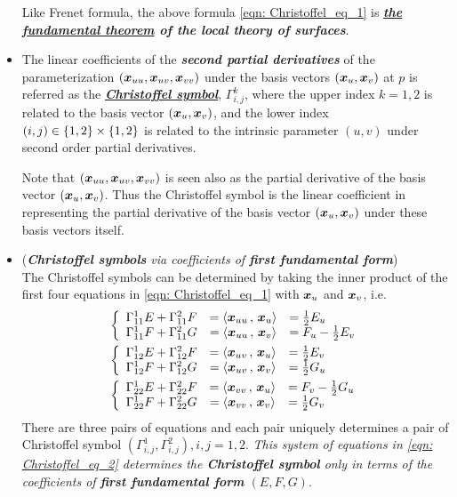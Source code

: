 \documentclass[11pt]{article}
\begin{document}
\begin{itemize}
Like Frenet formula, the above formula \eqref{eqn: Christoffel_eq_1} is \emph{\textbf{\underline{the fundamental theorem} of the local theory of surfaces}}. 

\item The linear coefficients of the \textbf{\emph{second partial derivatives}} of the parameterization $(\boldsymbol{x}_{uu}, \boldsymbol{x}_{uv}, \boldsymbol{x}_{vv})$ under the basis vectors $(\boldsymbol{x}_{u}, \boldsymbol{x}_{v})$ at $p$ is referred as the \underline{\emph{\textbf{Christoffel symbol}}}, $\Gamma_{i,j}^{k}$, where the upper index $k=1,2$ is related to the basis vector $(\boldsymbol{x}_{u}, \boldsymbol{x}_{v})$, and the lower index $(i,j) \in \left\{1,2\right\}\times \left\{1,2\right\}$ is related to the intrinsic parameter $(u,v)$ under second order partial derivatives. 

Note that  $(\boldsymbol{x}_{uu}, \boldsymbol{x}_{uv}, \boldsymbol{x}_{vv})$ is seen also as the partial derivative of the basis vector $(\boldsymbol{x}_{u}, \boldsymbol{x}_{v})$. Thus the Christoffel symbol is the linear coefficient in representing  the partial derivative of the basis vector $(\boldsymbol{x}_{u}, \boldsymbol{x}_{v})$ under these basis vectors itself. 

\item (\emph{\textbf{Christoffel symbols} via coefficients of \textbf{first fundamental form}})\\
The Christoffel symbols can be determined by taking the inner product of the first four equations in \eqref{eqn: Christoffel_eq_1} with $\boldsymbol{x}_{u}$ and $\boldsymbol{x}_{v}$, i.e. 
\begin{align}
&\left\{ \begin{array}{ccl}
\Gamma_{11}^{1}E + \Gamma_{11}^{2}F &= \left\langle \boldsymbol{x}_{uu}\,,\, \boldsymbol{x}_{u} \right\rangle &= \frac{1}{2}E_{u} \\ 
\Gamma_{11}^{1}F + \Gamma_{11}^{2}G &= \left\langle \boldsymbol{x}_{uu}\,,\, \boldsymbol{x}_{v} \right\rangle &= F_{u} - \frac{1}{2}E_{v} 
\end{array} \right. \nonumber\\
&\left\{ \begin{array}{ccl}
\Gamma_{12}^{1}E + \Gamma_{12}^{2}F &= \left\langle \boldsymbol{x}_{uv}\,,\, \boldsymbol{x}_{u} \right\rangle &= \frac{1}{2}E_{v} \\ 
\Gamma_{12}^{1}F + \Gamma_{12}^{2}G &= \left\langle \boldsymbol{x}_{uv}\,,\, \boldsymbol{x}_{v} \right\rangle &= \frac{1}{2}G_{u}  
\end{array} \right. \nonumber\\
&\left\{ \begin{array}{ccl}
\Gamma_{22}^{1}E + \Gamma_{22}^{2}F &= \left\langle \boldsymbol{x}_{vv}\,,\, \boldsymbol{x}_{u} \right\rangle &=F_{v} - \frac{1}{2}G_{u}  \\ 
\Gamma_{22}^{1}F + \Gamma_{22}^{2}G &= \left\langle \boldsymbol{x}_{vv}\,,\, \boldsymbol{x}_{v} \right\rangle &= \frac{1}{2}G_{v}   
\end{array} \right. \label{eqn: Christoffel_eq_2}
\end{align}
There are three pairs of equations and each pair uniquely determines a pair of Christoffel symbol $(\Gamma_{i,j}^{1}, \Gamma_{i,j}^{2}), i,j=1,2$. \emph{This system of equations in \eqref{eqn: Christoffel_eq_2} determines the \textbf{Christoffel symbol} only in terms of the coefficients of \textbf{first fundamental form} $(E,F,G)$}.  


\end{itemize}
\end{document}
